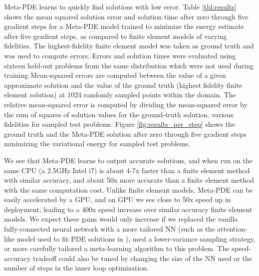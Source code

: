 Meta-PDE learns to quickly find solutions with low error. Table \ref{tbl:results}
shows the mean squared solution error and solution time after zero through five gradient steps for
a Meta-PDE model trained to minimize the energy estimate after five gradient steps,
as compared to finite element models of varying fidelities.
The highest-fidelity finite element model was taken as ground truth and was used to
compute errors.
Errors and solution times were evaluated using sixteen held-out problems from the same
distribution which were not used during training
Mean-squared errors are computed
between the value of a given approximate solution and the value of the ground truth
(highest fidelity finite element solution) at 1024 randomly sampled points within
the domain.
The relative mean-squared error is computed by dividing the mean-squared error by
the sum of squares of solution values for the ground-truth solution.
various fidelities for sampled test problems.
Figure \ref{fig:results_per_step} shows the ground truth and the Meta-PDE solution after
zero through five gradient steps minimizing the variational energy for
sampled test problems.


We see that Meta-PDE learns to output accurate solutions, and when run on the same
CPU (a 2.5GHz Intel i7) is about 4-7x faster than a finite element method with similar
accuracy, and about 50x more accurate than a finite element method
with the same computation cost.
Unlike finite element models, Meta-PDE can be easily accelerated by a GPU,
and on GPU we see close to 50x speed up in deployment,
leading to a 400x speed increase over similar accuracy finite element models.
We expect these gains would only increase if we replaced the vanilla fully-connected
neural network with a more tailored NN (such as the attention-like model used
to fit PDE solutions in \citet{wang2020understanding}),
used a lower-variance sampling strategy,
or more carefully tailored a meta-learning algorithm to this problem.
The speed-accuracy tradeoff could also be tuned by changing the size of the NN used
or the number of steps in the inner loop optimization.
